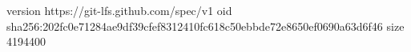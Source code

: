 version https://git-lfs.github.com/spec/v1
oid sha256:202fc0e71284ae9df39cfef8312410fc618c50ebbde72e8650ef0690a63d6f46
size 4194400

